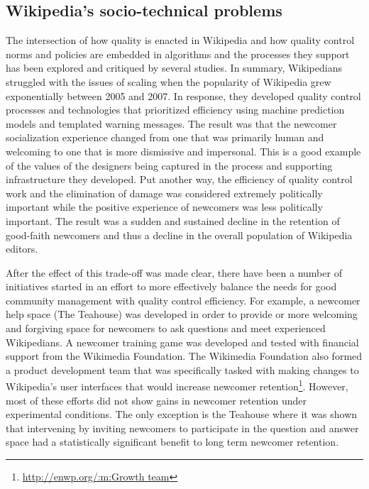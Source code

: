 \subsection{Wikipedia's socio-technical problems}
The intersection of how quality is enacted in Wikipedia and how quality control norms and policies are embedded in algorithms and the processes they support has been explored and critiqued by several studies\cite{halfaker2013rise}\cite{morgan2013tea}\cite{halfaker2014snuggle}.  In summary, Wikipedians struggled with the issues of scaling when the popularity of Wikipedia grew exponentially between 2005 and 2007\cite{halfaker2013rise}.  In response, they developed quality control processes and technologies that prioritized efficiency using machine prediction models\cite{halfaker2014snuggle} and templated warning messages\cite{halfaker2013rise}.  The result was that the newcomer socialization experience changed from one that was primarily human and welcoming to one that is more dismissive and impersonal\cite{morgan2013tea}.  This is a good example of the values of the designers being captured in the process and supporting infrastructure they developed\cite{halfaker2014snuggle}.  Put another way, the efficiency of quality control work and the elimination of damage was considered extremely politically important while the positive experience of newcomers was less politically important.  The result was a sudden and sustained decline in the retention of good-faith newcomers and thus a decline in the overall population of Wikipedia editors\cite{halfaker2013rise}.

After the effect of this trade-off was made clear, there have been a number of initiatives started in an effort to more effectively balance the needs for good community management with quality control efficiency.  For example, a newcomer help space (The Teahouse\cite{morgan2013tea}) was developed in order to provide or more welcoming and forgiving space for newcomers to ask questions and meet experienced Wikipedians.  A newcomer training game was developed and tested with financial support from the Wikimedia Foundation\cite{narayan2015effects}.  The Wikimedia Foundation also formed a product development team that was specifically tasked with making changes to Wikipedia's user interfaces that would increase newcomer retention\footnote{\url{http://enwp.org/:m:Growth team}}.  However, most of these efforts did not show gains in newcomer retention under experimental conditions.  The only exception is the Teahouse where it was shown that intervening by inviting newcomers to participate in the question and answer space had a statistically significant benefit to long term newcomer retention\cite{morgan2018evaluating}.

